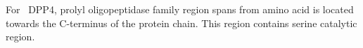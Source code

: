 For~ DPP4, prolyl oligopeptidase family region spans from amino acid is located towards the C-terminus of the protein chain. This region contains serine catalytic region.  